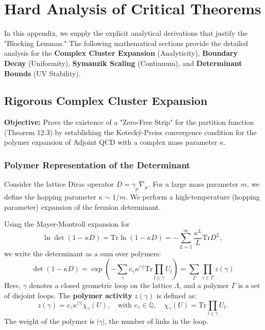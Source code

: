 \section{Hard Analysis of Critical Theorems}
\label{app:hard_analysis}
\label{ch:hard-analysis}
\label{app:gap2-complex-path}

In this appendix, we supply the explicit analytical derivations that justify the "Blocking Lemmas." The following mathematical sections provide the detailed analysis for the \textbf{Complex Cluster Expansion} (Analyticity), \textbf{Boundary Decay} (Uniformity), \textbf{Symanzik Scaling} (Continuum), and \textbf{Determinant Bounds} (UV Stability).

\subsection{Rigorous Complex Cluster Expansion}
\label{sec:complex_cluster}

\textbf{Objective:} Prove the existence of a "Zero-Free Strip" for the partition function (Theorem 12.3) by establishing the Koteck\'y-Preiss convergence condition for the polymer expansion of Adjoint QCD with a complex mass parameter $\kappa$.

\subsubsection{Polymer Representation of the Determinant}
Consider the lattice Dirac operator $D = \gamma_\mu \nabla_\mu$. For a large mass parameter $m$, we define the hopping parameter $\kappa \sim 1/m$. We perform a high-temperature (hopping parameter) expansion of the fermion determinant.

Using the Mayer-Montroll expansion for 
\[
\ln \det (1 - \kappa D) = \text{Tr} \ln (1 - \kappa D) = -\sum_{L=1}^\infty \frac{\kappa^L}{L} \text{Tr} D^L,
\]
we write the determinant as a sum over polymers:
\[
\det(1 - \kappa D) = \exp\left( - \sum_{\gamma} c_\gamma \kappa^{|\gamma|} \text{Tr} \prod_{l \in \gamma} U_l \right) = \sum_{\Gamma} \prod_{\gamma \in \Gamma} z(\gamma)
\]
Here, $\gamma$ denotes a closed geometric loop on the lattice $\Lambda$, and a polymer $\Gamma$ is a set of disjoint loops. The \textbf{polymer activity} $z(\gamma)$ is defined as:
\[
z(\gamma) = c_\gamma \kappa^{|\gamma|} \chi_\gamma(U), \quad \text{with } c_\gamma \in \mathbb{Q}, \quad \chi_\gamma(U) = \text{Tr} \prod_{l \in \gamma} U_l.
\]
The weight of the polymer is $|\gamma|$, the number of links in the loop.


